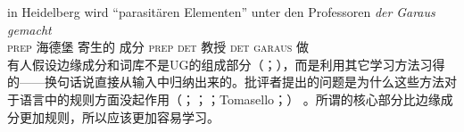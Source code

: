 \ex
\gll in Heidelberg wird "`parasitären Elementen"' unter den Professoren \emph{der} \emph{Garaus} \emph{gemacht}\footnotemark\\
	 \textsc{prep} 海德堡 \passiveprs{} 寄生的 成分 \textsc{prep} \textsc{det} 教授 \textsc{det} \textsc{garaus} 做\\
\zl
\noindent
有人假设边缘成分和词库不是UG的组成部分（\citealp[--151]{Chomsky86}；\citealp[]{Fodor98a}），而是利用其它学习方法习得的——换句话说直接从输入中归纳出来的。批评者提出的问题是为什么这些方法对于语言中的规则方面没起作用（\citealp[]{Abney96a}；\citealp[]{Goldberg2003b}；\citealp[]{Newmeyer2005a}；Tomasello\citeyear[]{Tomasello2006a}；\citeyear[]{Tomasello2006c}） 。所谓的核心部分比边缘成分更加规则，所以应该更加容易学习。

